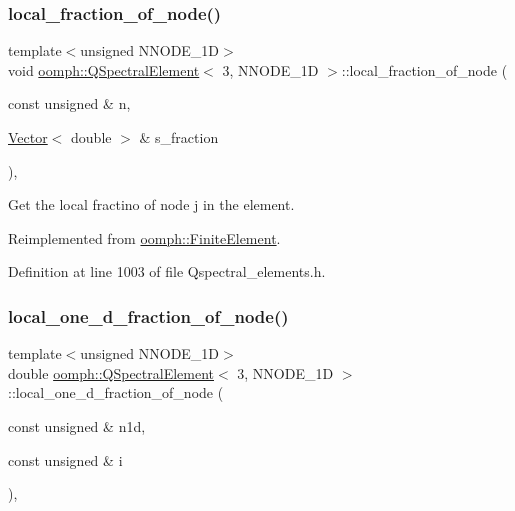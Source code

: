 \subsubsection{\texorpdfstring{local\+\_\+fraction\+\_\+of\+\_\+node()}{local\_fraction\_of\_node()}}
{\footnotesize\ttfamily template$<$unsigned N\+N\+O\+D\+E\+\_\+1D$>$ \\
void \hyperlink{classoomph_1_1QSpectralElement}{oomph\+::\+Q\+Spectral\+Element}$<$ 3, N\+N\+O\+D\+E\+\_\+1D $>$\+::local\+\_\+fraction\+\_\+of\+\_\+node (\begin{DoxyParamCaption}\item[{const unsigned \&}]{n,  }\item[{\hyperlink{classoomph_1_1Vector}{Vector}$<$ double $>$ \&}]{s\+\_\+fraction }\end{DoxyParamCaption})\hspace{0.3cm}{\ttfamily [inline]}, {\ttfamily [virtual]}}



Get the local fractino of node j in the element. 



Reimplemented from \hyperlink{classoomph_1_1FiniteElement_a41640b9a9e5f6461cd8ebb8218502b07}{oomph\+::\+Finite\+Element}.



Definition at line 1003 of file Qspectral\+\_\+elements.\+h.

\mbox{\label{classoomph_1_1QSpectralElement_3_013_00_01NNODE__1D_01_4_ac8f828c53b7346c5d33d70c497653ded}} 
\subsubsection{\texorpdfstring{local\+\_\+one\+\_\+d\+\_\+fraction\+\_\+of\+\_\+node()}{local\_one\_d\_fraction\_of\_node()}}
{\footnotesize\ttfamily template$<$unsigned N\+N\+O\+D\+E\+\_\+1D$>$ \\
double \hyperlink{classoomph_1_1QSpectralElement}{oomph\+::\+Q\+Spectral\+Element}$<$ 3, N\+N\+O\+D\+E\+\_\+1D $>$\+::local\+\_\+one\+\_\+d\+\_\+fraction\+\_\+of\+\_\+node (\begin{DoxyParamCaption}\item[{const unsigned \&}]{n1d,  }\item[{const unsigned \&}]{i }\end{DoxyParamCaption})\hspace{0.3cm}{\ttfamily [inline]}, {\ttfamily [virtual]}}



